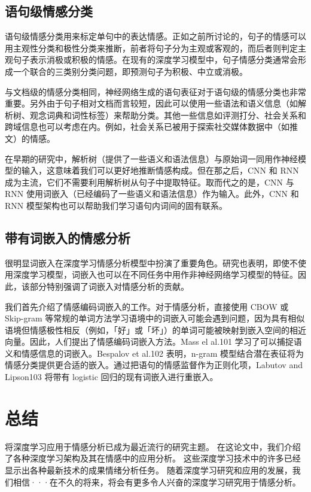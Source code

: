 \documentclass[lang=cn,11pt,a4paper]{elegantpaper}
\begin{document}
\subsection{语句级情感分类}
语句级情感分类用来标定单句中的表达情感。正如之前所讨论的，句子的情感可以用主观性分类和极性分类来推断，前者将句子分为主观或客观的，而后者则判定主观句子表示消极或积极的情感。在现有的深度学习模型中，句子情感分类通常会形成一个联合的三类别分类问题，即预测句子为积极、中立或消极。

与文档级的情感分类相同，神经网络生成的语句表征对于语句级的情感分类也非常重要。另外由于句子相对文档而言较短，因此可以使用一些语法和语义信息（如解析树、观念词典和词性标签）来帮助分类。其他一些信息如评测打分、社会关系和跨域信息也可以考虑在内。例如，社会关系已被用于探索社交媒体数据中（如推文）的情感。

在早期的研究中，解析树（提供了一些语义和语法信息）与原始词一同用作神经模型的输入，这意味着我们可以更好地推断情感构成。但在那之后，CNN 和 RNN 成为主流，它们不需要利用解析树从句子中提取特征。取而代之的是，CNN 与 RNN 使用词嵌入（已经编码了一些语义和语法信息）作为输入。此外，CNN 和 RNN 模型架构也可以帮助我们学习语句内词间的固有联系。

\subsection{带有词嵌入的情感分析}
很明显词嵌入在深度学习情感分析模型中扮演了重要角色。研究也表明，即使不使用深度学习模型，词嵌入也可以在不同任务中用作非神经网络学习模型的特征。因此，该部分特别强调了词嵌入对情感分析的贡献。

我们首先介绍了情感编码词嵌入的工作。对于情感分析，直接使用 CBOW 或 Skip-gram 等常规的单词方法学习语境中的词嵌入可能会遇到问题，因为具有相似语境但情感极性相反（例如，「好」或「坏」）的单词可能被映射到嵌入空间的相近向量。因此，人们提出了情感编码词嵌入方法。Mass el al.101 学习了可以捕捉语义和情感信息的词嵌入。Bespalov et al.102 表明，n-gram 模型结合潜在表征将为情感分类提供更合适的嵌入。通过把语句的情感监督作为正则化项，Labutov and Lipson103 将带有 logistic 回归的现有词嵌入进行重嵌入。

\section{总结}
将深度学习应用于情感分析已成为最近流行的研究主题。 在这论文中，我们介绍了各种深度学习架构及其在情感中的应用分析。 这些深度学习技术中的许多已经显示出各种最新技术的成果情绪分析任务。 随着深度学习研究和应用的发展，我们相信···在不久的将来，将会有更多令人兴奋的深度学习研究用于情感分析。


\end{document}
